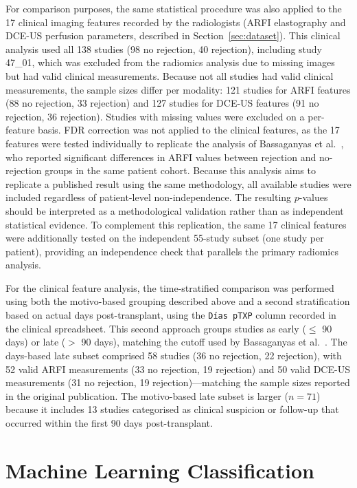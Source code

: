 For comparison purposes, the same statistical procedure was also applied to the 17 clinical imaging features recorded by the radiologists (ARFI elastography and DCE-US perfusion parameters, described in Section~\ref{sec:dataset}). This clinical analysis used all 138 studies (98 no rejection, 40 rejection), including study 47\_01, which was excluded from the radiomics analysis due to missing images but had valid clinical measurements. Because not all studies had valid clinical measurements, the sample sizes differ per modality: 121 studies for ARFI features (88 no rejection, 33 rejection) and 127 studies for DCE-US features (91 no rejection, 36 rejection). Studies with missing values were excluded on a per-feature basis. FDR correction was not applied to the clinical features, as the 17 features were tested individually to replicate the analysis of Bassaganyas et al.\ \cite{bassaganyas2025}, who reported significant differences in ARFI values between rejection and no-rejection groups in the same patient cohort. Because this analysis aims to replicate a published result using the same methodology, all available studies were included regardless of patient-level non-independence. The resulting $p$-values should be interpreted as a methodological validation rather than as independent statistical evidence. To complement this replication, the same 17 clinical features were additionally tested on the independent 55-study subset (one study per patient), providing an independence check that parallels the primary radiomics analysis.

For the clinical feature analysis, the time-stratified comparison was performed using both the motivo-based grouping described above and a second stratification based on actual days post-transplant, using the \texttt{D\'{i}as pTXP} column recorded in the clinical spreadsheet. This second approach groups studies as early ($\leq$ 90 days) or late ($>$ 90 days), matching the cutoff used by Bassaganyas et al.\ \cite{bassaganyas2025}. The days-based late subset comprised 58 studies (36 no rejection, 22 rejection), with 52 valid ARFI measurements (33 no rejection, 19 rejection) and 50 valid DCE-US measurements (31 no rejection, 19 rejection)---matching the sample sizes reported in the original publication. The motivo-based late subset is larger ($n = 71$) because it includes 13 studies categorised as clinical suspicion or follow-up that occurred within the first 90 days post-transplant.


\section{Machine Learning Classification}
\label{sec:ml_classification}


